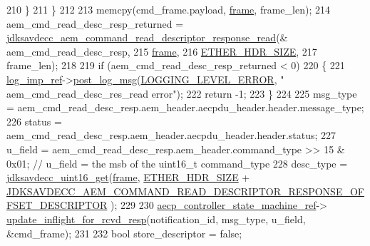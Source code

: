 \begin{DoxyCode}
210         \}
211     \}
212 
213     memcpy(cmd\_frame.payload, \hyperlink{gst__avb__playbin_8c_ac8e710e0b5e994c0545d75d69868c6f0}{frame}, frame\_len);
214     aem\_cmd\_read\_desc\_resp\_returned = 
      \hyperlink{group__command__read__descriptor__response_ga5158f2f9b162b942560eec4283169b05}{jdksavdecc\_aem\_command\_read\_descriptor\_response\_read}(&
      aem\_cmd\_read\_desc\_resp,
215                                                                                            
      \hyperlink{gst__avb__playbin_8c_ac8e710e0b5e994c0545d75d69868c6f0}{frame},
216                                                                                            
      \hyperlink{namespaceavdecc__lib_a6c827b1a0d973e18119c5e3da518e65ca9512ad9b34302ba7048d88197e0a2dc0}{ETHER\_HDR\_SIZE},
217                                                                                            frame\_len);
218 
219     \textcolor{keywordflow}{if} (aem\_cmd\_read\_desc\_resp\_returned < 0)
220     \{
221         \hyperlink{namespaceavdecc__lib_acbe3e2a96ae6524943ca532c87a28529}{log\_imp\_ref}->\hyperlink{classavdecc__lib_1_1log_a68139a6297697e4ccebf36ccfd02e44a}{post\_log\_msg}(\hyperlink{namespaceavdecc__lib_a501055c431e6872ef46f252ad13f85cdaf2c4481208273451a6f5c7bb9770ec8a}{LOGGING\_LEVEL\_ERROR}, \textcolor{stringliteral}{"
      aem\_cmd\_read\_desc\_res\_read error"});
222         \textcolor{keywordflow}{return} -1;
223     \}
224 
225     msg\_type = aem\_cmd\_read\_desc\_resp.aem\_header.aecpdu\_header.header.message\_type;
226     status = aem\_cmd\_read\_desc\_resp.aem\_header.aecpdu\_header.header.status;
227     u\_field = aem\_cmd\_read\_desc\_resp.aem\_header.command\_type >> 15 & 0x01; \textcolor{comment}{// u\_field = the msb of the
       uint16\_t command\_type}
228     desc\_type = \hyperlink{group__endian_ga3fbbbc20be954aa61e039872965b0dc9}{jdksavdecc\_uint16\_get}(\hyperlink{gst__avb__playbin_8c_ac8e710e0b5e994c0545d75d69868c6f0}{frame}, 
      \hyperlink{namespaceavdecc__lib_a6c827b1a0d973e18119c5e3da518e65ca9512ad9b34302ba7048d88197e0a2dc0}{ETHER\_HDR\_SIZE} + 
      \hyperlink{group__command__read__descriptor__response_gafbdbe4e6fbe486f0e98450bd1bcecafc}{JDKSAVDECC\_AEM\_COMMAND\_READ\_DESCRIPTOR\_RESPONSE\_OFFSET\_DESCRIPTOR}
      );
229 
230     \hyperlink{namespaceavdecc__lib_a0b1b5aea3c0490f77cbfd9178af5be22}{aecp\_controller\_state\_machine\_ref}->
      \hyperlink{classavdecc__lib_1_1aecp__controller__state__machine_a997abd9786c330a5505e903e6443208e}{update\_inflight\_for\_rcvd\_resp}(notification\_id, msg\_type, u\_field, &cmd\_frame);
231 
232     \textcolor{keywordtype}{bool} store\_descriptor = \textcolor{keyword}{false};

\end{DoxyCode}
